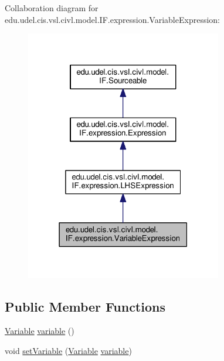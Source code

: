 Collaboration diagram for edu.\+udel.\+cis.\+vsl.\+civl.\+model.\+I\+F.\+expression.\+Variable\+Expression\+:
\nopagebreak
\begin{figure}[H]
\begin{center}
\leavevmode
\includegraphics[width=243pt]{interfaceedu_1_1udel_1_1cis_1_1vsl_1_1civl_1_1model_1_1IF_1_1expression_1_1VariableExpression__coll__graph}
\end{center}
\end{figure}
\subsection*{Public Member Functions}
\begin{DoxyCompactItemize}
\item 
\hyperlink{interfaceedu_1_1udel_1_1cis_1_1vsl_1_1civl_1_1model_1_1IF_1_1variable_1_1Variable}{Variable} \hyperlink{interfaceedu_1_1udel_1_1cis_1_1vsl_1_1civl_1_1model_1_1IF_1_1expression_1_1VariableExpression_ad27b6dd469c504a4ef1119172caa5e78}{variable} ()
\item 
void \hyperlink{interfaceedu_1_1udel_1_1cis_1_1vsl_1_1civl_1_1model_1_1IF_1_1expression_1_1VariableExpression_a511a724f49893bf7bae1fc91bd42e8fd}{set\+Variable} (\hyperlink{interfaceedu_1_1udel_1_1cis_1_1vsl_1_1civl_1_1model_1_1IF_1_1variable_1_1Variable}{Variable} \hyperlink{interfaceedu_1_1udel_1_1cis_1_1vsl_1_1civl_1_1model_1_1IF_1_1expression_1_1VariableExpression_ad27b6dd469c504a4ef1119172caa5e78}{variable})
\end{DoxyCompactItemize}



